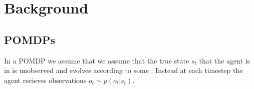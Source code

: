 

\section{Background}
    \subsection{POMDPs}
        In a POMDP we assume that we assume that the true state $s_t$ that the
        agent is in is unobserved and evolves according to some . Instead at each timestep the agent recieves
        observations $o_t \sim p(o_t | s_t)$. 

